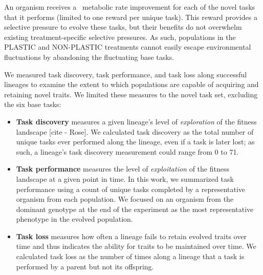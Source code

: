 An organism receives a \novelTraitsReward\ metabolic rate improvement for each of the novel tasks that it performs (limited to one reward per unique task).
This reward provides a selective pressure to evolve these tasks, but their benefits do not overwhelm existing treatment-specific selective pressures.
As such, populations in the PLASTIC and NON-PLASTIC treatments cannot easily escape environmental fluctuations by abandoning the fluctuating base tasks.

We measured task discovery, task performance, and task loss along successful lineages to examine the extent to which populations are capable of acquiring and retaining novel traits. %
We limited these measures to the novel task set, excluding the six base tasks:

\begin{itemize}
    \item \textbf{Task discovery} measures a given lineage's level of \textit{exploration} of the fitness landscape [cite - Rose].
We calculated task discovery as the total number of unique tasks ever performed along the lineage, even if a task is later lost; as such, a lineage's task discovery measurement could range from 0 to 71.

\item \textbf{Task performance} measures the level of \textit{exploitation} of the fitness landscape at a given point in time.
In this work, we summarized task performance using a count of unique tasks completed by a representative organism from each population.
We focused on an organism from the dominant genotype at the end of the experiment as the most representative phenotype in the evolved population.

\item \textbf{Task loss} measures how often a lineage fails to retain evolved traits over time and thus indicates the ability for traits to be maintained over time.
We calculated task loss as the number of times along a lineage that a task is performed by a parent but not its offspring. 

\end{itemize}

